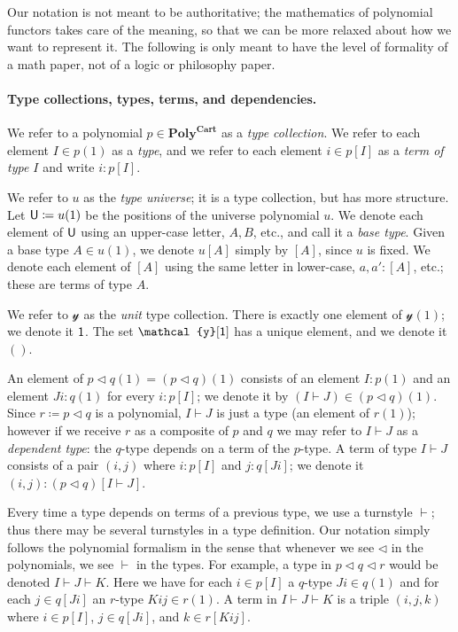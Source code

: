 \documentclass[11pt, one side, article]{memoir}
\theoremstyle{definition}
\theoremstyle{plain}
\newcommand{\Cat}[1]{\mathbf{#1}}%
\newcommand{\tn}[1]{\textnormal{#1}}
\newcommand{\yon}{\mathcal{y}}
\newcommand{\poly}{\Cat{Poly}}
\newcommand{\polycart}{\poly^{\Cat{Cart}}}
\newcommand{\0}{\textsf{0}}
\newcommand{\1}{\tn{\textsf{1}}}
\newcommand{\U}{\tn{\textsf{U}}}
\newcommand{\tri}{\mathbin{\triangleleft}}
\begin{document}
Our notation is not meant to be authoritative; the mathematics of polynomial functors takes care of the meaning, so that we can be more relaxed about how we want to represent it. The following is only meant to have the level of formality of a math paper, not of a logic or philosophy paper.

\paragraph{Type collections, types, terms, and dependencies.}
We refer to a polynomial $p\in\polycart$ as a \emph{type collection}. We refer to each element $I\in p(1)$ as a \emph{type}, and we refer to each element $i\in p[I]$ as a \emph{term of type $I$} and write $i:p[I]$.

We refer to $u$ as the \emph{type universe}; it is a type collection, but has more structure. Let $\U\coloneqq u(1)$ be the positions of the universe polynomial $u$. We denote each element of $\U$ using an upper-case letter, $A,B$, etc., and call it a \emph{base type}. Given a base type $A\in u(1)$, we denote $u[A]$ simply by $[A]$, since $u$ is fixed. We denote each element of $[A]$ using the same letter in lower-case, $a,a':[A]$, etc.; these are terms of type $A$.

We refer to $\yon$ as the \emph{unit} type collection. There is exactly one element of $\yon(1)$; we denote it $\1$. The set $\yon[\1]$ has a unique element, and we denote it $()$.

An element of $p\tri q(1)=(p\tri q)(1)$ consists of an element $I:p(1)$ and an element $J i:q(1)$ for every $i:p[I]$; we denote it by $(I\vdash J)\in (p\tri q)(1)$. Since $r\coloneqq p\tri q$ is a polynomial, $I\vdash J$ is just a type (an element of $r(1)$); however if we receive $r$ as a composite of $p$ and $q$ we may refer to $I\vdash J$ as a \emph{dependent type}: the $q$-type depends on a term of the $p$-type. A term of type $I\vdash J$ consists of a pair $(i,j)$ where $i:p[I]$ and $j: q[J i]$; we denote it $(i,j):(p\tri q)[I\vdash J]$.

Every time a type depends on terms of a previous type, we use a turnstyle $\vdash$; thus there may be several turnstyles in a type definition. Our notation simply follows the polynomial formalism in the sense that whenever we see $\tri$ in the polynomials, we see $\vdash$ in the types. For example, a type in $p\tri q\tri r$ would be denoted $I\vdash J\vdash K$. Here we have for each $i\in p[I]$ a $q$-type $Ji\in q(1)$ and for each $j\in q[J i]$ an $r$-type $Kij\in r(1)$. A term in $I\vdash J\vdash K$ is a triple $(i,j,k)$ where $i\in p[I]$, $j\in q[Ji]$, and $k\in r[Kij]$.
\end{document}
